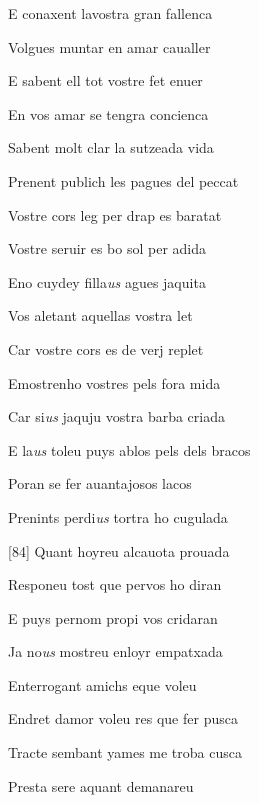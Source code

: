 \documentclass[12pt]{article}
\begin{document}
\begin{estrofa}

 E conaxent lavostra gran fallenca

 Volgues muntar en amar caualler

 E sabent ell tot vostre fet enuer

 En vos amar se tengra concienca

 Sabent molt clar la sutzeada vida

 Prenent publich les pagues del peccat

 Vostre cors leg per drap es baratat

 Vostre seruir es bo sol per adida

\end{estrofa}



\begin{estrofa}

 Eno cuydey filla\textit{us} agues jaquita

 Vos aletant aquellas vostra let

 Car vostre cors es de verj replet

 Emostrenho vostres pels fora mida

 Car si\textit{us} jaquju vostra barba criada

 E la\textit{us} toleu puys ablos pels dels bracos

 Poran se fer auantajosos lacos

 Prenints perdi\textit{us} tortra ho cugulada

\end{estrofa}



\begin{estrofa}

 [84] Quant hoyreu alcauota prouada

 Responeu tost que pervos ho diran

 E puys pernom propi vos cridaran

 Ja no\textit{us} mostreu enloyr empatxada

 Enterrogant amichs eque voleu

 Endret damor voleu res que fer pusca

 Tracte sembant yames me troba cusca

 Presta sere aquant demanareu

\end{estrofa}
\end{document}
